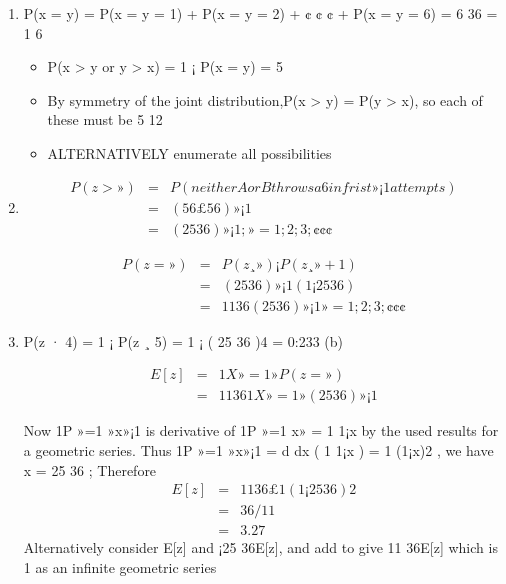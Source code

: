 \documentclass[a4paper,12pt]{article}
\begin{document}
\begin{enumerate}
    \item 
P(x = y) = P(x = y = 1) + P(x = y = 2) + ¢ ¢ ¢ + P(x = y = 6) = 6
36 = 1
6
\begin{itemize}
    \item P(x > y or y > x) = 1 ¡ P(x = y) = 5
\item By symmetry of the joint distribution,P(x > y) = P(y > x), so each of these must be
5
12
\item ALTERNATIVELY enumerate all possibilities
\end{itemize}

\item 
\begin{eqnarray*}
P(z > ») &=& P(neither A or B throws a 6 in frist » ¡ 1 attempts)\\
&=& ( 5
6 £ 5
6 )»¡1 \\
&=& ( 25
36 )»¡1; » = 1; 2; 3; ¢ ¢ ¢
\end{eqnarray*}

\begin{eqnarray*}
P(z = ») &=& P(z ¸ ») ¡ P(z ¸ » + 1)\\
&=& ( 25
36 )»¡1(1 ¡ 25
36 ) \\
&=& 11
36 ( 25
36 )»¡1 » = 1; 2; 3; ¢ ¢ ¢
\end{eqnarray*}

\item 
P(z · 4) = 1 ¡ P(z ¸ 5) = 1 ¡ (
25
36
)4 = 0:233
(b)

\begin{eqnarray*}
E[z] &=&
1X
»=1
»P(z = ») \\ &=&
11
36
1X
»=1
»(
25
36
)»¡1
\end{eqnarray*}

Now
1P
»=1
»x»¡1 is derivative of
1P
»=1
x» = 1
1¡x by the used results for a geometric series.
Thus
1P
»=1
»x»¡1 = d
dx ( 1
1¡x ) = 1
(1¡x)2 , we have x = 25
36 ;
Therefore
\begin{eqnarray}
E[z] &=& 11
36
£
1
(1 ¡ 25
36 )2 \\&=&
36/11
\\ &=& 3.27
\end{eqnarray}
Alternatively consider E[z] and ¡25
36E[z], and add to give 11
36E[z] which is 1 as an
infinite geometric series
\end{enumerate}
\end{document}
